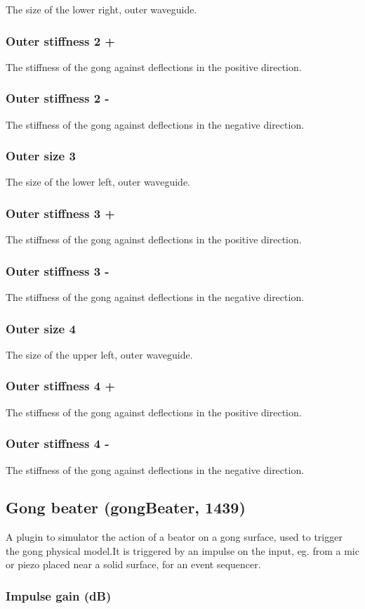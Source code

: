 \documentclass[11pt]{article}
\begin{document}
The size of the lower right, outer waveguide.\subsubsection*{Outer stiffness 2 +}
The stiffness of the gong against deflections in the positive direction.\subsubsection*{Outer stiffness 2 -}
The stiffness of the gong against deflections in the negative direction.\subsubsection*{Outer size 3}
The size of the lower left, outer waveguide.\subsubsection*{Outer stiffness 3 +}
The stiffness of the gong against deflections in the positive direction.\subsubsection*{Outer stiffness 3 -}
The stiffness of the gong against deflections in the negative direction.\subsubsection*{Outer size 4}
The size of the upper left, outer waveguide.\subsubsection*{Outer stiffness 4 +}
The stiffness of the gong against deflections in the positive direction.\subsubsection*{Outer stiffness 4 -}
The stiffness of the gong against deflections in the negative direction.\subsection{Gong beater (gongBeater, 1439)\label{gongBeater}\label{id1439}}
A plugin to simulator the action of a beator on a gong surface, used to trigger the gong physical model.It is triggered by an impulse on the input, eg. from a mic or piezo placed near a solid surface, for an event sequencer.\subsubsection*{Impulse gain (dB)}
\end{document}
